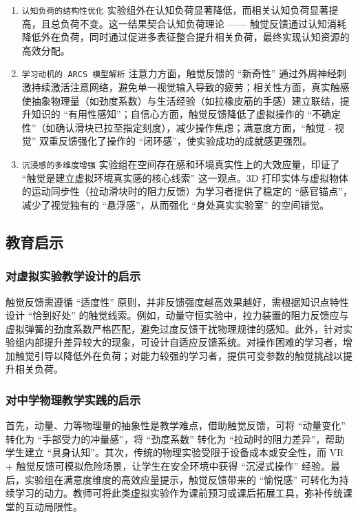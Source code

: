 \documentclass[runningheads]{llncs}
\begin{document}
\begin{enumerate}[label={\arabic*)}]
  \item \texttt{认知负荷的结构性优化} 实验组外在认知负荷显著降低，而相关认知负荷显著提高，且总负荷不变。这一结果契合认知负荷理论 —— 触觉反馈通过认知消耗降低外在负荷，同时通过促进多表征整合提升相关负荷，最终实现认知资源的高效分配。
  \item \texttt{学习动机的 ARCS 模型解析} 注意力方面，触觉反馈的 “新奇性” 通过外周神经刺激持续激活注意网络，避免单一视觉输入导致的疲劳；相关性方面，真实触感使抽象物理量（如劲度系数）与生活经验（如拉橡皮筋的手感）建立联结，提升知识的 “有用性感知”；自信心方面，触觉反馈降低了虚拟操作的 “不确定性”（如确认滑块已拉至指定刻度），减少操作焦虑；满意度方面，“触觉 - 视觉” 双重反馈强化了操作的 “闭环感”，使实验成功的成就感更强烈。
  \item \texttt{沉浸感的多维度增强} 实验组在空间存在感和环境真实性上的大效应量，印证了 “触觉是建立虚拟环境真实感的核心线索” 这一观点。3D 打印实体与虚拟物体的运动同步性（拉动滑块时的阻力反馈）为学习者提供了稳定的 “感官锚点”，减少了视觉独有的 “悬浮感”，从而强化 “身处真实实验室” 的空间错觉。
\end{enumerate}

\subsection{教育启示}
\subsubsection{对虚拟实验教学设计的启示}
触觉反馈需遵循 “适度性” 原则，并非反馈强度越高效果越好，需根据知识点特性设计 “恰到好处” 的触觉线索。例如，动量守恒实验中，拉力装置的阻力反馈应与虚拟弹簧的劲度系数严格匹配，避免过度反馈干扰物理规律的感知。此外，针对实验组内部提升差异较大的现象，可设计自适应反馈系统。对操作困难的学习者，增加触觉引导以降低外在负荷；对能力较强的学习者，提供可变参数的触觉挑战以提升相关负荷。

\subsubsection{对中学物理教学实践的启示}
首先，动量、力等物理量的抽象性是教学难点，借助触觉反馈，可将 “动量变化” 转化为 “手部受力的冲量感”，将 “劲度系数” 转化为 “拉动时的阻力差异”，帮助学生建立 “具身认知”。其次，传统的物理实验受限于设备成本或安全性，而 VR + 触觉反馈可模拟危险场景，让学生在安全环境中获得 “沉浸式操作” 经验。最后，实验组在满意度维度的高效应量提示，触觉反馈带来的 “愉悦感” 可转化为持续学习的动力。教师可将此类虚拟实验作为课前预习或课后拓展工具，弥补传统课堂的互动局限性。
\end{document}
